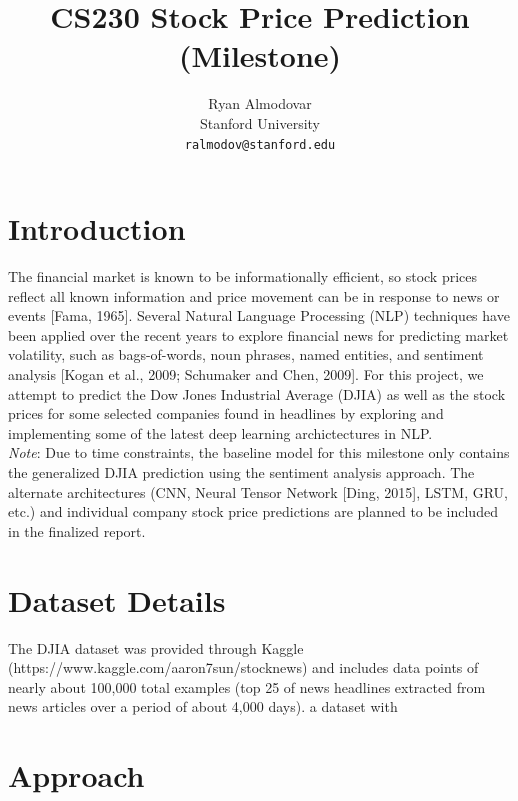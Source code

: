 \documentclass{article} %
\title{CS230 Stock Price Prediction (Milestone)}
\author{
Ryan Almodovar \\
Stanford University\\
\texttt{ralmodov@stanford.edu} \\
}
\begin{document}
\maketitle


\section{Introduction}
The financial market is known to be informationally efficient, so stock prices reflect all known
information and price movement can be in response to news or events [Fama, 1965].  
Several Natural Language Processing (NLP) techniques have been applied over the recent years to explore financial news for predicting market volatility,
such as bags-of-words, noun phrases, named entities, and sentiment analysis [Kogan et al., 2009; Schumaker and Chen, 2009].
For this project, we attempt to predict the Dow Jones Industrial Average (DJIA) as well as the stock prices for some selected companies found in headlines by exploring and implementing some of the latest deep learning archictectures in NLP.
\\
\textit{Note}: Due to time constraints, the baseline model for this milestone only contains the generalized DJIA prediction using the sentiment analysis approach.
The alternate architectures (CNN, Neural Tensor Network [Ding, 2015], LSTM, GRU, etc.)
and individual company stock price predictions are planned to be included in the finalized report.


\section{Dataset Details}

The DJIA dataset was provided through Kaggle (https://www.kaggle.com/aaron7sun/stocknews) and includes data points of nearly
about 100,000 total examples (top 25 of news headlines extracted from news articles over a period of about 4,000 days). a dataset with 


\section{Approach}
\end{document}
